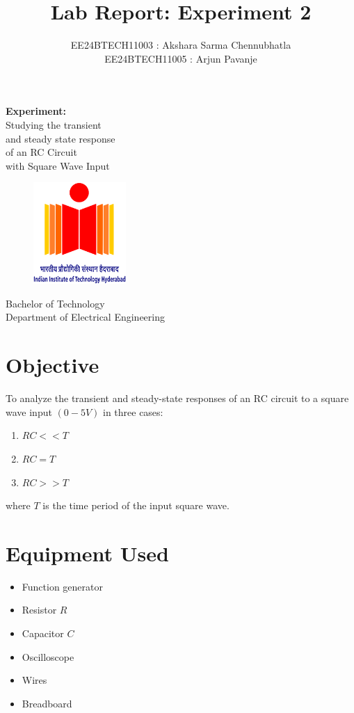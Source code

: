 \documentclass[a4paper,12pt]{article}
\title{\textbf{Lab Report: Experiment 2}}
\author{EE24BTECH11003 : Akshara Sarma Chennubhatla\\EE24BTECH11005 : Arjun Pavanje}
\begin{document}
\maketitle
\begin{center}
	\textbf{Experiment:}\\Studying the transient\\and steady state response\\of an RC Circuit\\with Square Wave Input
\end{center}
\vspace{30pt}
\begin{figure}[h!]
	\centering
	\includegraphics[width = 100pt]{.logo/logo.png}\\
\end{figure}
\begin{center}
	Bachelor of Technology\\
	\vspace{10pt}
	Department of Electrical Engineering\\
\end{center}
\newpage
\section*{Objective}

To analyze the transient and steady-state responses of an RC circuit to a square wave input $(0-5V)$ in three cases: \newline
\begin{enumerate}
	\item $RC << T$\\
	\item $RC = T$\\
	\item $RC >> T$
\end{enumerate}
where $T$ is the time period of the input square wave.


\section*{Equipment Used}
\begin{itemize}
	\item Function generator
	\item Resistor $R$
	\item Capacitor $C$
	\item Oscilloscope
	\item Wires
	\item Breadboard
\end{itemize}
\end{document}
